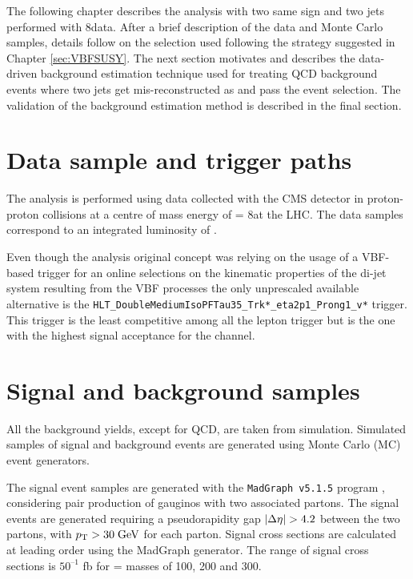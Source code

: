 
The following chapter describes the analysis with two same sign \hadtau and two jets performed with 8\tev data. After a brief description of the data and Monte Carlo samples, details follow on the selection used following the strategy suggested in Chapter \ref{sec:VBFSUSY}. The next section motivates and describes the data-driven background estimation technique used for treating QCD background events where two jets get mis-reconstructed as \hadtau and pass the event selection. The validation of the background estimation method is described in the final section.

\section {Data sample and trigger paths}

The analysis is performed using data collected with the CMS detector
in proton-proton collisions at a centre of mass energy of \CM = 8\tev at the LHC. The data samples correspond to an integrated luminosity of \lumiOld. 

Even though the analysis original concept was relying on the usage of a VBF-based trigger for an online selections on the kinematic properties of the di-jet system resulting from the VBF processes the only unprescaled available alternative is the \texttt{HLT\_\-DoubleMedium\-IsoPFTau35\_\-Trk*\_\-eta2p1\_\-Prong1\_\-v*} trigger. This trigger is the least competitive among all the lepton trigger but is the one with the highest signal acceptance for the \hadtau channel.

\section{Signal and background samples}



All the background yields, except for QCD, are taken from simulation. Simulated samples of signal and background events are generated using Monte Carlo (MC) event generators.

The signal event samples are generated with the \texttt{MadGraph v5.1.5} program \cite{Alwall:2011uj}, considering pair production of gauginos with two associated partons. The signal events are generated requiring a pseudorapidity gap $|\Delta\eta| > 4.2$ between the two partons, with $p_{\text{T}} > 30\;\text{Ge}\kern-0.06667em\text{V}$ for each parton. Signal cross sections are calculated at leading order using the MadGraph generator. The range of signal cross sections is $50^{–1}$ fb for \charginopm = \neutralinotwo masses of 100, 200 and 300\gev.

